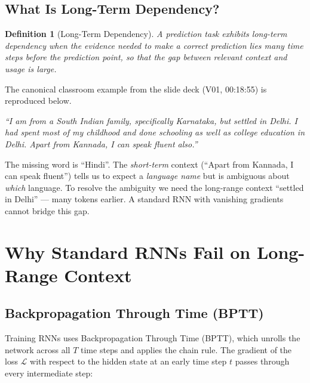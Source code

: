\documentclass[12pt,a4paper]{article}
\newtheorem{definition}{Definition}[section]
\begin{document}
\subsection{What Is Long-Term Dependency?}
\label{subsec:long-term}

\begin{definition}[Long-Term Dependency]
  \label{def:long-term}
  A prediction task exhibits \emph{long-term dependency} when the evidence
  needed to make a correct prediction lies many time steps before the
  prediction point, so that the gap between relevant context and usage is
  large.
\end{definition}

The canonical classroom example from the slide deck (V01, 00:18:55) is
reproduced below.

\begin{example}[title=Karnataka/Delhi/Hindi Example (V01)]
  \textit{``I am from a South Indian family, specifically Karnataka, but
  settled in Delhi. I had spent most of my childhood and done schooling as
  well as college education in Delhi. Apart from Kannada, I can speak
  fluent \underline{\hspace{1.5em}} also.''}

  \medskip
  \noindent The missing word is ``Hindi''. The \emph{short-term} context
  (``Apart from Kannada, I can speak fluent'') tells us to expect a
  \emph{language name} but is ambiguous about \emph{which} language.
  To resolve the ambiguity we need the long-range context
  ``settled in Delhi'' --- many tokens earlier. A standard RNN with
  vanishing gradients cannot bridge this gap.
\end{example}

\section{Why Standard RNNs Fail on Long-Range Context}
\label{sec:rnn-failure}

\subsection{Backpropagation Through Time (BPTT)}
\label{subsec:bptt}

Training RNNs uses Backpropagation Through Time (BPTT), which unrolls the
network across all $T$ time steps and applies the chain rule. The gradient
of the loss $\mathcal{L}$ with respect to the hidden state at an early time
step $t$ passes through every intermediate step:
\end{document}
